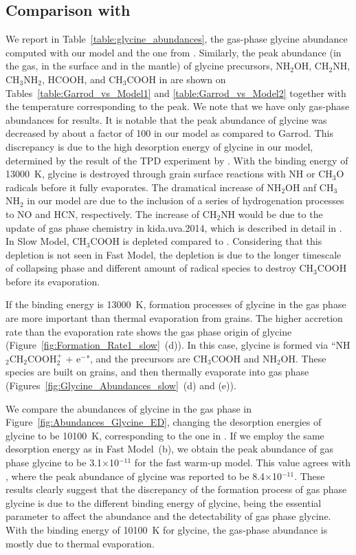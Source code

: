 \documentclass{aastex61}
\begin{document}
\subsection{Comparison with \cite{Garrod13}}
We report in Table~\ref{table:glycine_abundances}, the gas-phase glycine abundance computed with our model and the one from \cite[Table~8]{Garrod13}.
%
Similarly, the peak abundance (in the gas, in the surface and in the mantle) of glycine precursors, NH$_2$OH, CH$_2$NH, CH$_3$NH$_2$, HCOOH, and CH$_3$COOH in \cite{Garrod13} are shown on Tables~\ref{table:Garrod_vs_Model1} and \ref{table:Garrod_vs_Model2} together with the temperature corresponding to the peak.
%
We note that we have only gas-phase abundances for \cite{Garrod13} results.
%
It is notable that the peak abundance of glycine was decreased by about a factor of 100 in our model as compared to Garrod.
%
This discrepancy is due to the high desorption energy of glycine in our model, determined by the result of the TPD experiment by \cite{Tzvetkov04}.
%
With the binding energy of 13000~K, glycine is destroyed through grain surface reactions with NH or CH$_3$O radicals before it fully evaporates.
%
The dramatical increase of NH$_2$OH anf CH$_3$NH$_2$ in our model are due to the inclusion of a series of hydrogenation processes to NO and HCN, respectively.
%
The increase of CH$_2$NH would be due to the update of gas phase chemistry in kida.uva.2014, which is described in detail in \cite{Suzuki16}.
%
In Slow Model, CH$_3$COOH is depleted compared to \cite{Garrod13}.
%
Considering that this depletion is not seen in Fast Model, the depletion is due to the longer timescale of collapsing phase and different amount of radical species to destroy CH$_3$COOH before its evaporation.


If the binding energy is 13000~K, formation processes of glycine in the gas phase are more important than thermal evaporation from grains.
%
The higher accretion rate than the evaporation rate shows the gas phase origin of glycine (Figure~\ref{fig:Formation_Rate1_slow}~(d)).
%
In this case, glycine is formed via ``NH$_2$CH$_2$COOH$_2^+$ + e$^-$", and the precursors are CH$_3$COOH and NH$_2$OH.
%
These species are built on grains, and then thermally evaporate into gas phase (Figures~\ref{fig:Glycine_Abundances_slow}~(d) and (e)).




We compare the abundances of glycine in the gas phase in Figure~\ref{fig:Abundances_Glycine_ED}, changing the desorption energies of glycine to be 10100~K, corresponding to the one in \cite{Garrod13}.
%
If we employ the same desorption energy as \cite{Garrod13} in Fast Model~(b), we obtain the peak abundance of gas phase glycine to be 3.1$\times$10$^{-11}$ for the fast warm-up model.
%
This value agrees with \cite{Garrod13}, where the peak abundance of glycine was reported to be 8.4$\times$10$^{-11}$.
%
These results clearly suggest that the discrepancy of the formation process of gas phase glycine is due to the different binding energy of glycine, being the essential parameter to affect the abundance and the detectability of gas phase glycine.
%
With the binding energy of 10100~K for glycine, the gas-phase abundance is mostly due to thermal evaporation.
%
\end{document}
